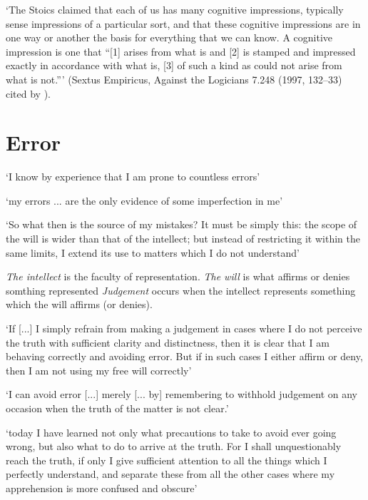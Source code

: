 \documentclass[12pt]{extarticle}
\begin{document}
\begin{multicols*}{3}
‘The Stoics claimed that each of us has many cognitive impressions,
typically sense impressions of a particular sort, and that these
cognitive impressions are in one way or another the basis for everything
that we can know. A cognitive impression is one that “[1] arises from
what is and [2] is stamped and impressed exactly in accordance with what
is, [3] of such a kind as could not arise from what is not.”’ (Sextus
Empiricus, Against the Logicians 7.248 (1997, 132–33) cited by
\citealp[p.~72]{broughton:2003_descartes}).

 
\section{Error}
 
‘I know by experience that I am prone to countless errors’
\citep[p.~38; AT VII: 54]{descartes:1985_csm2}
 
‘my errors ... are the only evidence of some imperfection in me’
\citep[p.~39; AT VII: 56]{descartes:1985_csm2}
 
‘So what then is the source of my mistakes?
It must be simply this: the scope of the will is wider than that of the intellect; but instead of restricting it within the same limits, I extend its use to matters which I do not understand’ 
\citep[p.~40; AT VII: 58]{descartes:1985_csm2}
 
\emph{The intellect} is the faculty of representation.
\emph{The will} is what affirms or denies somthing represented
\emph{Judgement} occurs when the intellect represents something which the will affirms (or denies).
 
‘If [...] I simply refrain from making a judgement in cases where I do not perceive the truth with sufficient clarity and distinctness, then it is clear that I am behaving correctly and avoiding error.  
But if in such cases I either affirm or deny, then I am not using my free will correctly’
\citep[p.~41; AT VII: 59--60]{descartes:1985_csm2}
 
‘I can avoid error [...] merely [... by] remembering to
withhold judgement on any occasion when the truth of the matter is not clear.’
\citep[p.~43; AT VII: 62]{descartes:1985_csm2}
 
‘today I have learned not only what precautions to take to avoid ever going
wrong,
but also what to do to arrive at the truth.
For I shall unquestionably
reach the truth, if only I give sufficient attention to all the things which I
perfectly understand, and separate these from all the other cases where my
apprehension is more confused and obscure’
\citep[p.~43; AT VII: 62]{descartes:1985_csm2}




\end{multicols*}
\end{document}
